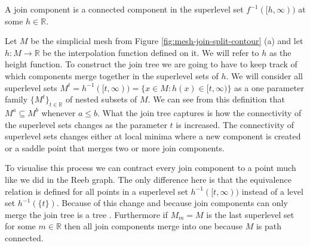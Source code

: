 \begin{defn} A join component is a connected component in the superlevel set $f^{-1}([h, \infty))$ at some $h \in \mathbb{R}$.  \end{defn}

Let $M$ be the simplicial mesh from Figure \ref{fig:mesh-join-split-contour} (a) and let $h : M \to \mathbb{R}$ be the interpolation function defined on it. We will refer to $h$ as the height function. To construct the join tree we are going to have to keep track of which components merge together in the superlevel sets of $h$. We will consider all superlevel sets $M^t = h^{-1}([t, \infty)) = \{x \in M : h(x) \in [t, \infty) \}$ as a one parameter family $\{M^t\}_{t \in \mathbb{R}}$
of nested subsets of $M$. We can see from this definition that $M^a \subseteq M^b$ whenever $a \le b$. What the join tree captures is how the connectivity of the superlevel sets changes as the parameter $t$ is increased. The connectivity of superlevel sets changes either at local minima where a new component is created or a saddle point that merges two or more join components.


To visualise this process we can contract every join component to a point much like we did in the Reeb graph. The only difference here is that the equivalence relation is defined for all points in a superlevel set $h^{-1}([t, \infty))$ instead of a level set $h^{-1}(\{t\})$. Because of this change and because join components can only merge the join tree is a tree \cite{comp-topo}. Furthermore if $M_m = M$ is the last superlevel set for some $m \in \mathbb{R}$ then all join components merge into one because $M$ is path connected.

